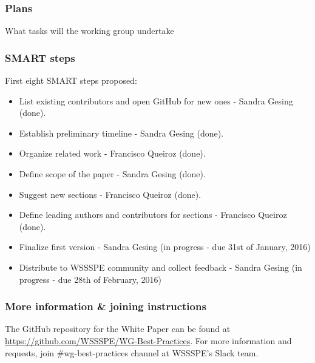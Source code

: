 \subsubsection{Plans}

What tasks will the working group undertake

\subsubsection{SMART steps}

First eight SMART steps proposed: \\
\begin{itemize}
\item List existing contributors and open GitHub for new ones - Sandra Gesing (done). 
\item Establish preliminary timeline  - Sandra Gesing (done). 
\item Organize related work - Francisco Queiroz (done). 
\item Define scope of the paper - Sandra Gesing (done). 
\item Suggest new sections - Francisco Queiroz (done). 
\item Define leading authors and contributors for sections - Francisco Queiroz (done). 
\item Finalize first version - Sandra Gesing (in progress - due 31st of January, 2016) 
\item Distribute to WSSSPE community and collect feedback - Sandra Gesing (in progress - due 28th of February, 2016) 
\end{itemize}

\subsubsection{More information \& joining instructions}

The GitHub repository for the White Paper can be found at \url{https://github.com/WSSSPE/WG-Best-Practices}. For more information and requests, join \#wg-best-practices channel at WSSSPE's Slack team.
